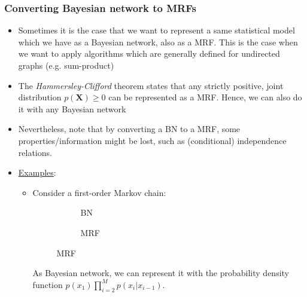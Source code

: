 \subsubsection{Converting Bayesian network to MRFs}
\begin{itemize}
	\item Sometimes it is the case that we want to represent a same statistical model which we have as a Bayesian network, also as a MRF. This is the case when we want to apply algorithms which are generally defined for undirected graphs (e.g. sum-product)
	\item The \textit{Hammersley-Clifford} theorem states that any strictly positive, joint distribution $p(\bm{X})\ge 0$ can be represented as a MRF. Hence, we can also do it with any Bayesian network
	\item Nevertheless, note that by converting a BN to a MRF, some properties/information might be lost, such as (conditional) independence relations. 
	\item \underline{Examples}:
	\begin{itemize}
		\item Consider a first-order Markov chain:
		\begin{figure}[ht!]
			\centering
			\begin{subfigure}{0.46\textwidth}
				\centering
				\caption{BN}
			\end{subfigure}
			\hspace{5mm}
			\begin{subfigure}{0.46\textwidth}
				\centering
				\caption{MRF}
			\end{subfigure}
		\end{figure}
	
		As Bayesian network, we can represent it with the probability density function $p(x_1)\prod_{i=2}^{M}p(x_i|x_{i-1})$.
		

\end{itemize}
\end{itemize}
